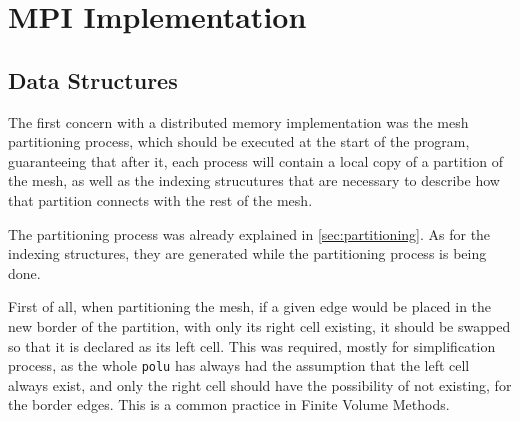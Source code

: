 \section{MPI Implementation}
\label{sec:implementation}

\subsection{Data Structures}
\label{subsec:structs}

The first concern with a distributed memory implementation was the mesh partitioning process, which should be executed at the start of the program, guaranteeing that after it, each process will contain a local copy of a partition of the mesh, as well as the indexing strucutures that are necessary to describe how that partition connects with the rest of the mesh.

The partitioning process was already explained in \cref{sec:partitioning}. As for the indexing structures, they are generated while the partitioning process is being done.

First of all, when partitioning the mesh, if a given edge would be placed in the new border of the partition, with only its right cell existing, it should be swapped so that it is declared as its left cell. This was required, mostly for simplification process, as the whole \texttt{polu} has always had the assumption that the left cell always exist, and only the right cell should have the possibility of not existing, for the border edges. This is a common practice in Finite Volume Methods.

